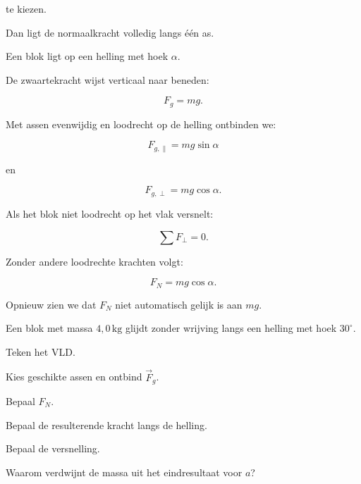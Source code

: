 \documentclass{ximera}
\begin{document}
te kiezen.

Dan ligt de normaalkracht volledig langs één as.




Een blok ligt op een helling met hoek $\alpha$.

De zwaartekracht wijst verticaal naar beneden:

\[
F_g=mg.
\]

Met assen evenwijdig en loodrecht op de helling ontbinden we:

\[
\boxed{
F_{g,\parallel}=mg\sin\alpha
}
\]

en

\[
\boxed{
F_{g,\perp}=mg\cos\alpha.
}
\]

Als het blok niet loodrecht op het vlak versnelt:

\[
\sum F_\perp=0.
\]

Zonder andere loodrechte krachten volgt:

\[
\boxed{
F_N=mg\cos\alpha.
}
\]

Opnieuw zien we dat $F_N$ niet automatisch gelijk is aan $mg$.


\begin{oefening}{\oefU\ESS}

Een blok met massa $4,0\,\mathrm{kg}$ glijdt zonder wrijving langs een
helling met hoek $30^\circ$.

\begin{question}
Teken het VLD.
\end{question}

\begin{question}
Kies geschikte assen en ontbind $\vec F_g$.
\end{question}

\begin{question}
Bepaal $F_N$.
\end{question}

\begin{question}
Bepaal de resulterende kracht langs de helling.
\end{question}

\begin{question}
Bepaal de versnelling.
\end{question}

\begin{question}
Waarom verdwijnt de massa uit het eindresultaat voor $a$?
\end{question}

\end{oefening}
\end{document}
